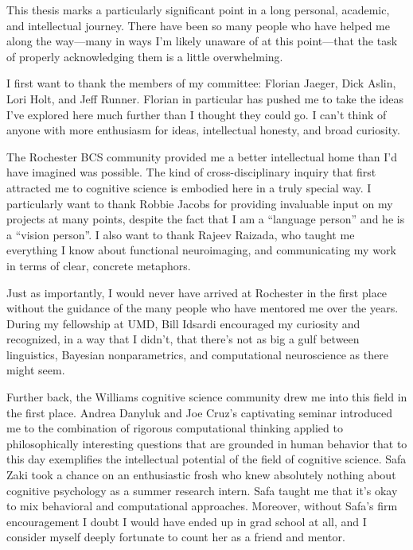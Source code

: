 \begin{acknowledgments}

  This thesis marks a particularly significant point in a long personal,
  academic, and intellectual journey. There have been so many people who have
  helped me along the way---many in ways I'm likely unaware of at this
  point---that the task of properly acknowledging them is a little overwhelming.
  
  I first want to thank the members of my committee: Florian Jaeger, Dick Aslin,
  Lori Holt, and Jeff Runner. Florian in particular has pushed me to take the
  ideas I've explored here much further than I thought they could go. I can't
  think of anyone with more enthusiasm for ideas, intellectual honesty, and
  broad curiosity.

  The Rochester BCS community provided me a better intellectual home than I'd
  have imagined was possible. The kind of cross-disciplinary inquiry that
  first attracted me to cognitive science is embodied here in a truly special
  way. I particularly want to thank Robbie Jacobs for providing invaluable input
  on my projects at many points, despite the fact that I am a ``language
  person'' and he is a ``vision person''. I also want to thank Rajeev Raizada,
  who taught me everything I know about functional neuroimaging, and
  communicating my work in terms of clear, concrete metaphors.

  Just as importantly, I would never have arrived at Rochester in the first
  place without the guidance of the many people who have mentored me over the
  years. During my fellowship at UMD, Bill Idsardi encouraged my curiosity and
  recognized, in a way that I didn't, that there's not as big a gulf between
  linguistics, Bayesian nonparametrics, and computational neuroscience as there
  might seem.

  Further back, the Williams cognitive science community drew me into this field
  in the first place. Andrea Danyluk and Joe Cruz's captivating seminar
  introduced me to the combination of rigorous computational thinking applied to
  philosophically interesting questions that are grounded in human behavior that
  to this day exemplifies the intellectual potential of the field of cognitive
  science. Safa Zaki took a chance on an enthusiastic frosh who knew absolutely
  nothing about cognitive psychology as a summer research intern. Safa taught me
  that it's okay to mix behavioral and computational approaches. Moreover,
  without Safa's firm encouragement I doubt I would have ended up in grad school
  at all, and I consider myself deeply fortunate to count her as a friend and
  mentor.


\end{acknowledgments}
